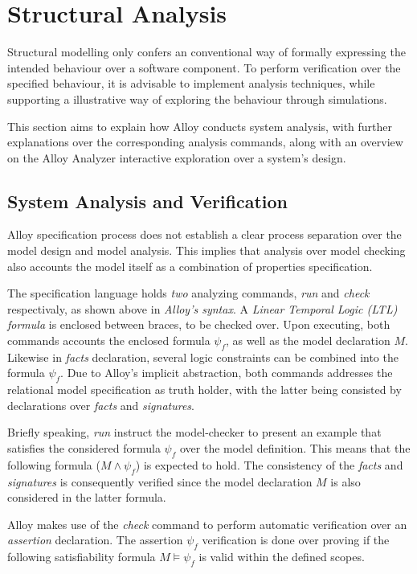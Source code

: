 \section{Structural Analysis}

Structural modelling only confers an conventional way of formally expressing the intended behaviour over a software component. To perform verification over the specified behaviour, it is advisable to implement analysis techniques, while supporting a illustrative way of exploring the behaviour through simulations. 

This section aims to explain how Alloy conducts system analysis, with further explanations over the corresponding analysis commands, along with an overview on the Alloy Analyzer interactive exploration over a system's design. 

\subsection{System Analysis and Verification}

Alloy specification process does not establish a clear process separation over the model design and model analysis. This implies that analysis over model checking also accounts the model itself as a combination of properties specification. 

The specification language holds \textit{two} analyzing commands, \textit{run} and \textit{check} respectivaly, as shown above in \textit{Alloy's syntax}. A \textit{Linear Temporal Logic (LTL) formula} is enclosed between braces, to be checked over. Upon executing, both commands accounts the enclosed formula $\psi_{f}$, as well as the model declaration ${M}$. Likewise in \textit{facts} declaration, several logic constraints can be combined into the formula $\psi_{f}$. Due to Alloy's implicit abstraction, both commands addresses the relational model specification as truth holder, with the latter being consisted by declarations over \textit{facts} and \textit{signatures}. 

Briefly speaking, \textit{run} instruct the model-checker to present an example that satisfies the considered formula $\psi_{f}$ over the model definition. This means that the following formula ($M \wedge \psi_{f}$) is expected to hold. The consistency of the \textit{facts} and \textit{signatures} is consequently verified since the model declaration $M$ is also considered in the latter formula. 

Alloy makes use of the \textit{check} command to perform automatic verification over an \textit{assertion} declaration. The assertion $\psi_{f}$ verification is done over proving if the following satisfiability formula $M \models \psi_{f}$ is valid within the defined scopes. %

